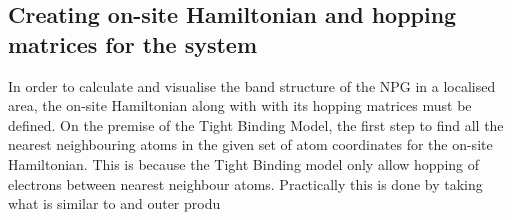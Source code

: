 \subsection{Creating on-site Hamiltonian and hopping matrices for the system}
In order to calculate and visualise the band structure of the NPG in a localised area, the on-site Hamiltonian along with with its hopping matrices must be defined. On the premise of the Tight Binding Model, the first step to find all the nearest neighbouring atoms in the given set of atom coordinates for the on-site Hamiltonian. This is because the Tight Binding model only allow hopping of electrons between nearest neighbour atoms. Practically this is done by taking what is similar to and outer produ
